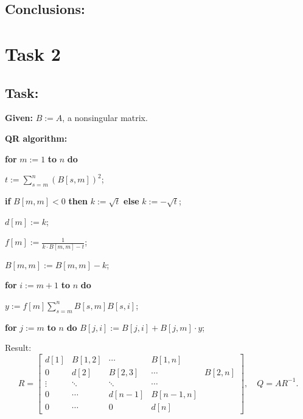 \documentclass[a4paper, 11pt]{article}
\begin{document}
\subsection{Conclusions:}

\section{Task 2}
\subsection{Task:}
\noindent \textbf{Given:} \( B := A \), a nonsingular matrix.

\begin{center} \textbf{QR algorithm:} \end{center}
\begin{algindent}
    \item \textbf{for} \( m := 1 \) \textbf{to} \( n \) \textbf{do}
    \item \hspace{1.5em} \( t := \sum_{s=m}^n (B[s, m])^2 \);
    \item \hspace{1.5em} \textbf{if} \( B[m, m] < 0 \) \textbf{then} \( k := \sqrt{t} \) \textbf{else} \( k := -\sqrt{t} \);
    \item \hspace{1.5em} \( d[m] := k \);
    \item \hspace{1.5em} \( f[m] := \frac{1}{k \cdot B[m, m] - t} \);
    \item \hspace{1.5em} \( B[m, m] := B[m, m] - k \);
    \item \hspace{1.5em} \textbf{for} \( i := m+1 \) \textbf{to} \( n \) \textbf{do}
    \item \hspace{3em} \( y := f[m] \sum_{s=m}^n B[s, m] B[s, i] \);
    \item \hspace{3em} \textbf{for} \( j := m \) \textbf{to} \( n \) \textbf{do} \( B[j, i] := B[j, i] + B[j, m] \cdot y \);
\end{algindent}

\noindent Result:
\[
R = \begin{bmatrix}
d[1] & B[1, 2] & \cdots & B[1, n] \\
0 & d[2] & B[2, 3] & \cdots & B[2, n] \\
\vdots & \ddots & \ddots & \cdots \\
0 & \cdots & d[n-1] & B[n-1, n] \\
0 & \cdots & 0 & d[n]
\end{bmatrix}, \quad Q = A R^{-1}.
\]
\end{document}
